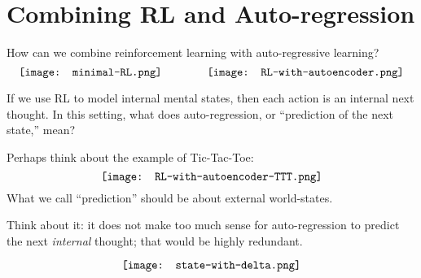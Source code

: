 \chapter{Combining RL and Auto-regression}
\label{chap:RL-Autoregression}

How can we combine reinforcement learning with auto-regressive learning?
\begin{equation}
\vcenter{\hbox{\texttt{[image: minimal-RL.png]}}}
\qquad \qquad
\vcenter{\hbox{\texttt{[image: RL-with-autoencoder.png]}}}
\end{equation}

If we use RL to model internal mental states, then each action is an internal next thought.  In this setting, what does auto-regression, or ``prediction of the next state,'' mean?

Perhaps think about the example of Tic-Tac-Toe:
\begin{equation}
\vcenter{\hbox{\texttt{[image: RL-with-autoencoder-TTT.png]}}}
\end{equation}
What we call ``prediction'' should be about external world-states.  

Think about it:  it does not make too much sense for auto-regression to predict the next \textit{internal} thought;  that would be highly redundant.



\begin{equation}
\vcenter{\hbox{\texttt{[image: state-with-delta.png]}}}
\end{equation}


